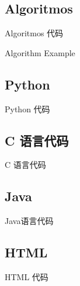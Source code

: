 \documentclass{libs/ccnu_format}
\begin{document}
\subsection{Algoritmos}
\begin{frame}{Algoritmos 代码}
    \begin{algorithm}[H]
        \SetAlgoLined
        \LinesNumbered
         \caption{Algorithm Example}
    \end{algorithm}
\end{frame}

\subsection{Python}
\begin{frame}{Python 代码}
    \lstset{language=Python}
    
\end{frame}

\subsection{C 语言代码}
\begin{frame}{C 语言代码}
    
\end{frame}

\subsection{Java}
\begin{frame}{Java语言代码}
    
\end{frame}

\subsection{HTML}
\begin{frame}{HTML 代码}
    
\end{frame}
\end{document}
